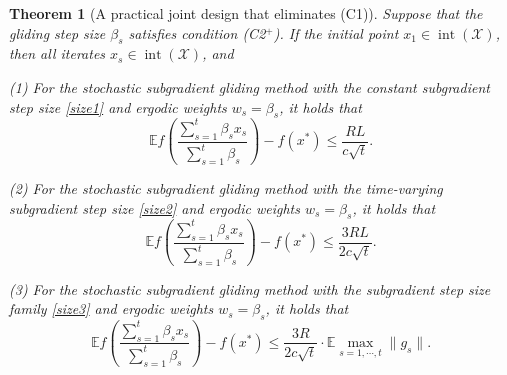 \documentclass[sn-mathphys]{JORSC-jnl}%
\theoremstyle{thmstyleone}%
\newtheorem{theorem}{Theorem}[section]%
\theoremstyle{thmstylethree}%
\begin{document}
\begin{theorem}[A practical joint design that eliminates (C1)]\label{cor:joint_design1}
	Suppose that the gliding step size $\beta_s$ satisfies condition (C2$^+$).
	If the initial point $x_1 \in \operatorname{int}(\mathcal{X})$, then all iterates $x_s \in \operatorname{int}(\mathcal{X})$, and
	
	(1) For the stochastic subgradient gliding method with the constant subgradient step size \eqref{size1} and  ergodic weights $w_s = \beta_s$, it holds that
	\begin{equation}\label{WeakConvergence5pd}
		\mathbb{E}f\left( \frac{\sum_{s=1}^t \beta_s x_s}{\sum_{s=1}^t \beta_s} \right) - f(x^*)
		\leq \frac{RL}{c\sqrt{t}}.
	\end{equation}
	
	(2) For the stochastic subgradient gliding method with the time-varying subgradient step size \eqref{size2} and ergodic weights $w_s = \beta_s$, it holds that
	\begin{equation}\label{WeakConvergence6pd}
		\mathbb{E}f\left( \frac{\sum_{s=1}^t \beta_s x_s}{\sum_{s=1}^t \beta_s} \right) - f(x^*)
		\leq \frac{3RL}{2c\sqrt{t}}.
	\end{equation}
	
	(3) For the stochastic subgradient gliding method with the subgradient step size family \eqref{size3} and ergodic weights $w_s = \beta_s$, it holds that
	\begin{equation}\label{WeakConvergence7pd}
		\mathbb{E}f\left( \frac{\sum_{s=1}^t \beta_s x_s}{\sum_{s=1}^t \beta_s} \right) - f(x^*)
		\leq \frac{3R}{2c\sqrt{t}}\cdot \mathbb{E}\max_{s=1,\cdots,t}\|g_s\|.
	\end{equation}
\end{theorem}
\end{document}

